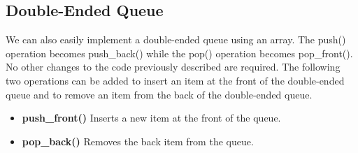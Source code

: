 \documentclass{report}
\begin{document}
    \bigbreak \noindent 
    \subsection{Double-Ended Queue}
    We can also easily implement a double-ended queue using an array. The push() operation becomes push\_back() while the pop() operation becomes pop\_front(). No other changes to the code previously described are required. The following two operations can be added to insert an item at the front of the double-ended queue and to remove an item from the back of the double-ended queue.
    \begin{itemize}
        \item \textbf{push\_front()} Inserts a new item at the front of the queue.
        \item \textbf{pop\_back()} Removes the back item from the queue.
    \end{itemize}
\end{document}
